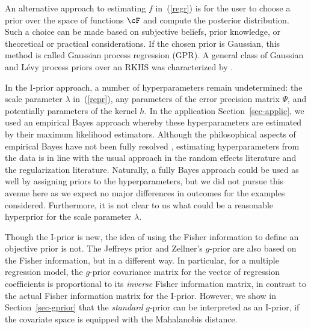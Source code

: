 \documentclass[preprint,12pt,authoryear]{elsarticle}
\begin{document}
An alternative approach to estimating $f$ in~(\ref{regr}) is for the user to choose a prior over the space of functions $\cF$ and compute the posterior distribution. Such a choice can be made based on subjective beliefs, prior knowledge, or theoretical or practical considerations. If the chosen prior is Gaussian, this method is called Gaussian process regression (GPR). A general class of Gaussian and L{\'e}vy process priors over an RKHS was characterized by \citet{pillai07}. 


In the I-prior approach, a number of hyperparameters remain undetermined: the scale parameter $\lambda$ in~(\ref{repr}), any parameters of the error precision matrix $\Psi$, and potentially parameters of the kernel $h$. In the application Section~\ref{sec-applic}, we used an empirical Bayes approach whereby these hyperparameters are estimated by their maximum likelihood estimators. Although the philosophical aspects of empirical Bayes have not been fully resolved \citep[see][with discussion]{efron19}, estimating hyperparameters from the data is in line with the usual approach in the random effects literature and the regularization literature. Naturally, a fully Bayes approach could be used as well by assigning priors to the hyperparameters, but we did not pursue this avenue here as we expect no major differences in outcomes for the examples considered. Furthermore, it is not clear to us what could be a reasonable hyperprior for the scale parameter $\lambda$. 


Though the I-prior is new, the idea of using the Fisher information to define an objective prior is not. The Jeffreys prior and Zellner's $g$-prior \citep{zellner86} are also based on the Fisher information, but in a different way. In particular, for a multiple regression model, the $g$-prior covariance matrix for the vector of regression coefficients is proportional to its {\em inverse} Fisher information matrix, in contrast to the actual Fisher information matrix for the I-prior. However, we show in Section~\ref{sec-gprior} that the {\em standard} $g$-prior can be interpreted as an I-prior, if the covariate space is equipped with the Mahalanobis distance. 
\end{document}
